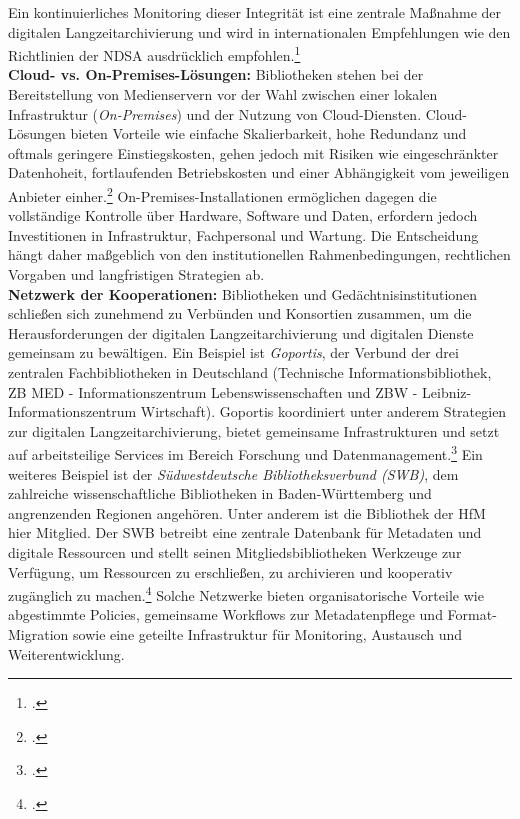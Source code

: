 \documentclass[12pt,a4paper]{report}
\begin{document}
  Ein kontinuierliches Monitoring dieser Integrität ist eine zentrale Maßnahme der digitalen Langzeitarchivierung 
  und wird in internationalen Empfehlungen wie den Richtlinien der \ac{NDSA} ausdrücklich empfohlen.\footcite[Vgl.][siehe Levels of Digital Preservation V2.0 Matrix und Curatorial Guidance]{ndsa_fixity}
  \\
  \newline
  \textbf{Cloud- vs. On-Premises-Lösungen:}  
  Bibliotheken stehen bei der Bereitstellung von Medienservern vor der Wahl zwischen einer lokalen Infrastruktur (\emph{On-Premises}) und der Nutzung von Cloud-Diensten.  
  Cloud-Lösungen bieten Vorteile wie einfache Skalierbarkeit, hohe Redundanz und oftmals geringere Einstiegskosten, gehen jedoch mit Risiken wie eingeschränkter Datenhoheit, fortlaufenden Betriebskosten und einer Abhängigkeit vom jeweiligen Anbieter einher.\footcite[Vgl.][S.~1]{paletta2015cloud}  
  On-Premises-Installationen ermöglichen dagegen die vollständige Kontrolle über Hardware, Software und Daten, erfordern jedoch Investitionen in Infrastruktur, Fachpersonal und Wartung.  
  Die Entscheidung hängt daher maßgeblich von den institutionellen Rahmenbedingungen, rechtlichen Vorgaben und langfristigen Strategien ab.
  \\
  \newline
  \textbf{Netzwerk der Kooperationen:}  
  Bibliotheken und Gedächtnisinstitutionen schließen sich zunehmend zu Verbünden und Konsortien zusammen, 
  um die Herausforderungen der digitalen Langzeitarchivierung und digitalen Dienste gemeinsam zu bewältigen.  
  Ein Beispiel ist \emph{Goportis}, der Verbund der drei zentralen Fachbibliotheken in Deutschland 
  (Technische Informationsbibliothek, ZB MED - Informationszentrum Lebenswissenschaften und ZBW - Leibniz-Informationszentrum Wirtschaft). 
  Goportis koordiniert unter anderem Strategien zur digitalen Langzeitarchivierung, 
  bietet gemeinsame Infrastrukturen und setzt auf arbeitsteilige Services im Bereich Forschung und Datenmanagement.\footcite[Vgl.][]{wikipedia_goportis}  
  Ein weiteres Beispiel ist der \emph{Südwestdeutsche Bibliotheksverbund (\ac{SWB})}, dem zahlreiche wissenschaftliche Bibliotheken in Baden-Württemberg 
  und angrenzenden Regionen angehören. Unter anderem ist die Bibliothek der HfM hier Mitglied. 
  Der \ac{SWB} betreibt eine zentrale Datenbank für Metadaten und digitale Ressourcen und stellt seinen Mitgliedsbibliotheken Werkzeuge zur Verfügung, 
  um Ressourcen zu erschließen, zu archivieren und kooperativ zugänglich zu machen.\footcite[Vgl.][]{swb}  
  Solche Netzwerke bieten organisatorische Vorteile wie abgestimmte Policies, gemeinsame Workflows zur Metadatenpflege 
  und Format-Migration sowie eine geteilte Infrastruktur für Monitoring, Austausch und Weiterentwicklung.
\end{document}
